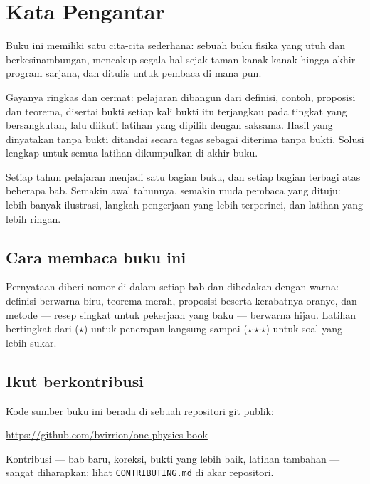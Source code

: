 \chapter{Kata Pengantar}

Buku ini memiliki satu cita-cita sederhana: sebuah buku fisika yang utuh
dan berkesinambungan, mencakup segala hal sejak taman kanak-kanak hingga
akhir program sarjana, dan ditulis untuk pembaca di mana pun.

Gayanya ringkas dan cermat: pelajaran dibangun dari definisi, contoh,
proposisi dan teorema, disertai bukti setiap kali bukti itu terjangkau
pada tingkat yang bersangkutan, lalu diikuti latihan yang dipilih dengan
saksama. Hasil yang dinyatakan tanpa bukti ditandai secara tegas sebagai
diterima tanpa bukti. Solusi lengkap untuk semua latihan dikumpulkan di
akhir buku.

Setiap tahun pelajaran menjadi satu bagian buku, dan setiap bagian
terbagi atas beberapa bab. Semakin awal tahunnya, semakin muda pembaca
yang dituju: lebih banyak ilustrasi, langkah pengerjaan yang lebih
terperinci, dan latihan yang lebih ringan.

\section*{Cara membaca buku ini}

Pernyataan diberi nomor di dalam setiap bab dan dibedakan dengan warna:
definisi berwarna biru, teorema merah, proposisi beserta kerabatnya
oranye, dan metode --- resep singkat untuk pekerjaan yang baku ---
berwarna hijau. Latihan bertingkat dari ($\star$) untuk penerapan
langsung sampai ($\star\star\star$) untuk soal yang lebih sukar.

\section*{Ikut berkontribusi}

Kode sumber buku ini berada di sebuah repositori git publik:
\begin{center}
\url{https://github.com/bvirrion/one-physics-book}
\end{center}
Kontribusi --- bab baru, koreksi, bukti yang lebih baik, latihan
tambahan --- sangat diharapkan; lihat \texttt{CONTRIBUTING.md} di akar
repositori.
